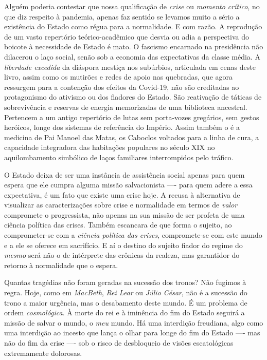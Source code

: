 Alguém poderia contestar que nossa qualificação de \textit{crise} ou
\textit{momento crítico}, no que diz respeito à pandemia, apenas faz
sentido se levamos muito a sério a existência do Estado como régua para
a normalidade. E com razão. A reprodução de um vasto repertório
teórico-acadêmico que desvia ou adia a perspectiva do boicote à
necessidade de Estado é mato. O fascismo encarnado na presidência não
dilacerou o laço social, senão sob a economia das expectativas da classe
média. A \textit{liberdade excedida} da diáspora mestiça nos subúrbios,
articulada em cenas deste livro, assim como os mutirões e redes de apoio
nas quebradas, que agora ressurgem para a contenção dos efeitos da
Covid-19, não são creditadas ao protagonismo do ativismo ou dos fiadores
do Estado. São reativação de táticas de sobrevivência e reservas de
energia memorizadas de uma biblioteca ancestral. Pertencem a um antigo
repertório de lutas sem porta-vozes gregários, sem gestos heróicos,
longe dos sistemas de referência do Império. Assim também o é a medicina
de Pai Manoel das Matas, os Caboclos voltados para a linha de cura, a
capacidade integradora das habitações populares no século XIX no
aquilombamento simbólico de laços familiares interrompidos pelo
tráfico.~

O Estado deixa de ser uma instância de assistência social apenas para
quem espera que ele cumpra alguma missão salvacionista ---- para quem
adere a essa expectativa, é um fato que existe uma crise hoje. A recusa
à alternativa de visualizar as caracterizações sobre crise e normalidade
em termos de \textit{valor} compromete o progressista, não apenas na sua
missão de ser profeta de uma ciência política das crises. Também
escancara de que forma o sujeito, ao comprometer-se com a \textit{ciência
política das crises}, compromete-se com este mundo e a ele se oferece em
sacrifício. E aí o destino do sujeito fiador do regime do \textit{mesmo}
será não o de intérprete das crônicas da realeza, mas garantidor do
retorno à normalidade que o espera.~

Quantas tragédias não foram geradas na sucessão dos tronos? Não fugimos
à regra. Hoje, como em \textit{MacBeth}, \textit{Rei Lear} ou \textit{Júlio
César}, não é a sucessão do trono a maior urgência, mas o desabamento
deste mundo. É um problema de ordem \textit{cosmológica}. À morte do rei e
à iminência do fim do Estado seguirá a missão de salvar o mundo, o
\textit{meu} mundo. Há uma interdição freudiana, algo como uma interdição
ao incesto que lança o olhar para longe do fim do Estado ---- mas não do
fim da crise ---- sob o risco de desbloqueio de visões escatológicas
extremamente dolorosas.

